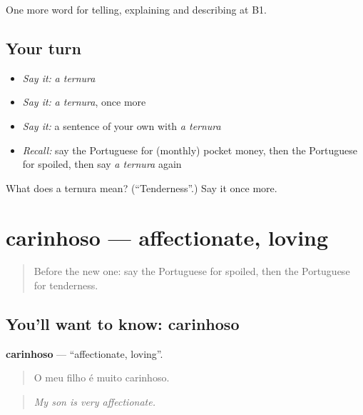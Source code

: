 \begin{grammarlens}[title={What you've built}]
One more word for telling, explaining and describing at B1.
\end{grammarlens}

\subsection*{Your turn}
\begin{itemize}
\raggedright
  \item \emph{Say it:} \emph{a ternura}
  \item \emph{Say it:} \emph{a ternura}, once more
  \item \emph{Say it:} a sentence of your own with \emph{a ternura}
  \item \emph{Recall:} say the Portuguese for (monthly) pocket money, then the Portuguese for spoiled, then say \emph{a ternura} again
\end{itemize}

\begin{tcolorbox}[breakable,colback=teal!4,colframe=teal!35!black,title={Before you move on}]
What does a ternura mean? (\textquotedblleft{}Tenderness\textquotedblright{}.) Say it once more.
\end{tcolorbox}
\section[carinhoso]{carinhoso — affectionate, loving}

\label{lesson:PT-C496-carinhoso}



\begin{quote}
Before the new one: say the Portuguese for spoiled, then the Portuguese for tenderness.
\end{quote}

\subsection*{You'll want to know: carinhoso}
\textbf{carinhoso} — \textquotedblleft{}affectionate, loving\textquotedblright{}.

\begin{quote}
O meu filho é muito carinhoso.
\end{quote}

\begin{quote}
\emph{My son is very affectionate.}
\end{quote}

